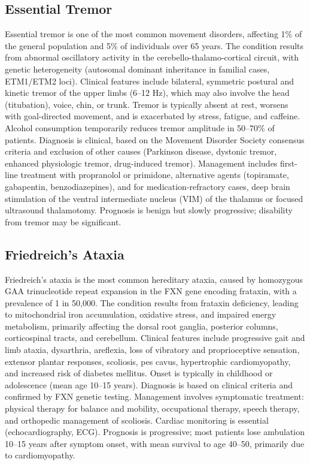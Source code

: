 \subsection{Essential Tremor}
\label{sec:Essential Tremor}
Essential tremor is one of the most common movement disorders, affecting 1\% of the general population and 5\% of individuals over 65 years. The condition results from abnormal oscillatory activity in the cerebello-thalamo-cortical circuit, with genetic heterogeneity (autosomal dominant inheritance in familial cases, ETM1/ETM2 loci). Clinical features include bilateral, symmetric postural and kinetic tremor of the upper limbs (6--12 Hz), which may also involve the head (titubation), voice, chin, or trunk. Tremor is typically absent at rest, worsens with goal-directed movement, and is exacerbated by stress, fatigue, and caffeine. Alcohol consumption temporarily reduces tremor amplitude in 50--70\% of patients. Diagnosis is clinical, based on the Movement Disorder Society consensus criteria and exclusion of other causes (Parkinson disease, dystonic tremor, enhanced physiologic tremor, drug-induced tremor). Management includes first-line treatment with propranolol or primidone, alternative agents (topiramate, gabapentin, benzodiazepines), and for medication-refractory cases, deep brain stimulation of the ventral intermediate nucleus (VIM) of the thalamus or focused ultrasound thalamotomy. Prognosis is benign but slowly progressive; disability from tremor may be significant.

\subsection{Friedreich's Ataxia}
\label{sec:Friedreich's Ataxia}
Friedreich's ataxia is the most common hereditary ataxia, caused by homozygous GAA trinucleotide repeat expansion in the FXN gene encoding frataxin, with a prevalence of 1 in 50,000. The condition results from frataxin deficiency, leading to mitochondrial iron accumulation, oxidative stress, and impaired energy metabolism, primarily affecting the dorsal root ganglia, posterior columns, corticospinal tracts, and cerebellum. Clinical features include progressive gait and limb ataxia, dysarthria, areflexia, loss of vibratory and proprioceptive sensation, extensor plantar responses, scoliosis, pes cavus, hypertrophic cardiomyopathy, and increased risk of diabetes mellitus. Onset is typically in childhood or adolescence (mean age 10--15 years). Diagnosis is based on clinical criteria and confirmed by FXN genetic testing. Management involves symptomatic treatment: physical therapy for balance and mobility, occupational therapy, speech therapy, and orthopedic management of scoliosis. Cardiac monitoring is essential (echocardiography, ECG). Prognosis is progressive; most patients lose ambulation 10--15 years after symptom onset, with mean survival to age 40--50, primarily due to cardiomyopathy.

